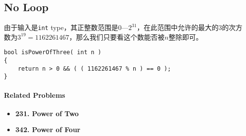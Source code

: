 \subsection{No Loop}
由于输入是\texttt{int} type，其正整数范围是$0$---$2^{31}$，在此范围中允许的最大的3的次方数为$ 3^{19}=1162261467 $，那么我们只要看这个数能否被$ n $整除即可。
\setcounter{lstlisting}{0}
\begin{lstlisting}[style=customc, caption={No Loop}]
bool isPowerOfThree( int n )
{
    return n > 0 && ( ( 1162261467 % n ) == 0 );
}
\end{lstlisting}

\paragraph{Related Problems}
\begin{itemize}
\item \textbf{231. Power of Two}
\item \textbf{342. Power of Four}
\end{itemize}